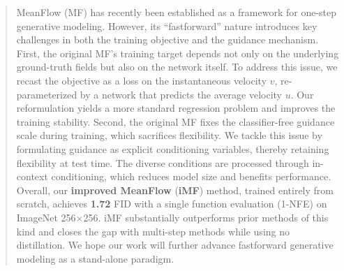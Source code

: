 \begin{abstract}
MeanFlow (MF) has recently been established as a framework for one-step generative modeling. However, its ``fastforward'' nature introduces key challenges in both the training objective and the guidance mechanism.
First, the original MF's training target depends not only on the underlying ground-truth fields but also on the network itself. To address this issue, we recast the objective as a loss on the instantaneous velocity $v$, re-parameterized by a network that predicts the average velocity $u$.
Our reformulation yields a more standard regression problem and improves the training stability.
Second, the original MF fixes the classifier-free guidance scale during training, which sacrifices flexibility.
We tackle this issue by formulating guidance as explicit conditioning variables, thereby retaining flexibility at test time.
The diverse conditions are processed through in-context conditioning, which reduces model size and benefits performance.
Overall, our \textbf{improved MeanFlow} (\textbf{iMF}) method, trained entirely from scratch, achieves \textbf{1.72} FID with a single function evaluation (1-NFE) on ImageNet 256$\times$256. 
iMF substantially outperforms prior methods of this kind and closes the gap with multi-step methods while using no distillation. 
We hope our work will further advance fastforward generative modeling as a stand-alone paradigm.
\end{abstract}